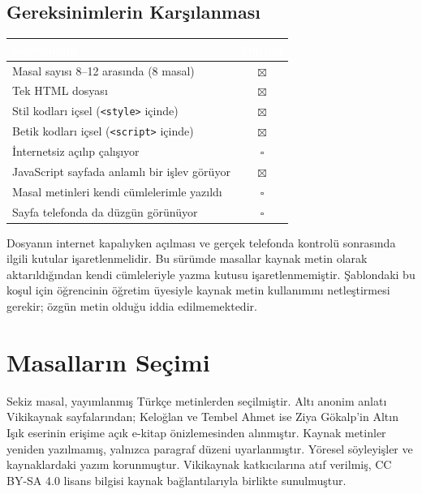 \documentclass[12pt,a4paper]{article}
\begin{document}
\subsection{Gereksinimlerin Karşılanması}
\begin{center}
\begin{tabular}{@{}p{8.2cm}c@{}}
\toprule
\rowcolor{ana}\textcolor{white}{\textbf{Gereksinim}} & \textcolor{white}{\textbf{Durum}} \\
\midrule
Masal sayısı 8--12 arasında (8 masal)         & $\boxtimes$ \\
Tek HTML dosyası                                    & $\boxtimes$ \\
Stil kodları içsel (\texttt{<style>} içinde)        & $\boxtimes$ \\
Betik kodları içsel (\texttt{<script>} içinde)      & $\boxtimes$ \\
İnternetsiz açılıp çalışıyor                        & $\square$ \\
JavaScript sayfada anlamlı bir işlev görüyor        & $\boxtimes$ \\
Masal metinleri kendi cümlelerimle yazıldı          & $\square$ \\
Sayfa telefonda da düzgün görünüyor                 & $\square$ \\
\bottomrule
\end{tabular}
\end{center}



Dosyanın internet kapalıyken açılması ve gerçek telefonda kontrolü sonrasında
ilgili kutular işaretlenmelidir. Bu sürümde masallar kaynak metin olarak
aktarıldığından kendi cümleleriyle yazma kutusu işaretlenmemiştir.
Şablondaki bu koşul için öğrencinin öğretim üyesiyle kaynak metin kullanımını
netleştirmesi gerekir; özgün metin olduğu iddia edilmemektedir.

\section{Masalların Seçimi}


Sekiz masal, yayımlanmış Türkçe metinlerden seçilmiştir. Altı anonim anlatı
Vikikaynak sayfalarından; Keloğlan ve Tembel Ahmet ise Ziya Gökalp'in
Altın Işık eserinin erişime açık e-kitap önizlemesinden alınmıştır. Kaynak
metinler yeniden yazılmamış, yalnızca paragraf düzeni uyarlanmıştır.
Yöresel söyleyişler ve kaynaklardaki yazım korunmuştur. Vikikaynak katkıcılarına
atıf verilmiş, CC BY-SA 4.0 lisans bilgisi kaynak bağlantılarıyla birlikte sunulmuştur.
\end{document}
